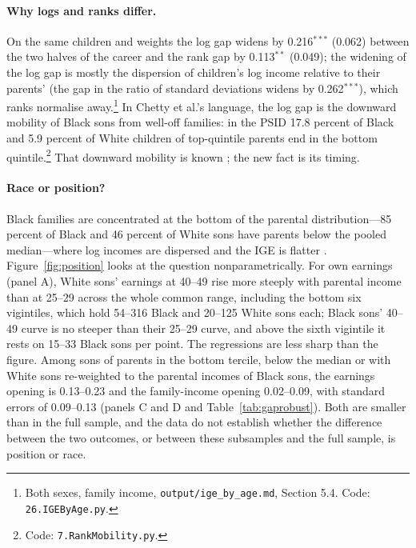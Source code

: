 \paragraph{Why logs and ranks differ.} On the same children and weights the log gap widens by 0.216$^{***}$ (0.062)
between the two halves of the career and the rank gap by 0.113$^{**}$ (0.049); the widening of the log gap is mostly
the dispersion of children's log income relative to their parents' (the gap in the ratio of standard deviations widens
by 0.262$^{***}$), which ranks normalise away.\footnote{Both sexes, family income, \texttt{output/ige\_by\_age.md},
Section 5.4. Code: \texttt{26.IGEByAge.py}.} In Chetty et al.'s language, the log gap is the downward mobility of
Black sons from well-off families: in the PSID 17.8 percent of Black and 5.9 percent of White children of top-quintile
parents end in the bottom quintile.\footnote{Code: \texttt{7.RankMobility.py}.} That downward mobility is known
\citep{hertz2005rags, bhattacharya2011nonparametric, mazumder2014black}; the new fact is its timing.

\paragraph{Race or position?} Black families are concentrated at the bottom of the parental distribution---85 percent
of Black and 46 percent of White sons have parents below the pooled median---where log incomes are dispersed and the
IGE is flatter \citep{bratsberg2007nonlinearities}. Figure~\ref{fig:position} looks at the question nonparametrically.
For own earnings (panel A), White sons' earnings at 40--49 rise more steeply with parental income than at 25--29 across
the whole common range, including the bottom six vigintiles, which hold 54--316 Black and 20--125 White sons each; Black
sons' 40--49 curve is no steeper than their 25--29 curve, and above the sixth vigintile it rests on 15--33 Black sons
per point. The regressions are less sharp than the figure. Among sons of parents in the bottom tercile, below the median
or with White sons re-weighted to the parental incomes of Black sons, the earnings opening is 0.13--0.23 and the
family-income opening 0.02--0.09, with standard errors of 0.09--0.13 (panels C and D and Table~\ref{tab:gaprobust}). Both
are smaller than in the full sample, and the data do not establish whether the difference between the two outcomes, or
between these subsamples and the full sample, is position or race.

